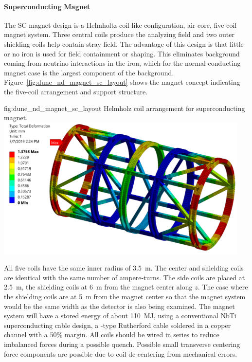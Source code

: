 \paragraph{Superconducting Magnet}
%
The SC magnet design is a Helmholtz-coil-like configuration, air core,  five coil magnet system. Three central coils produce the analyzing field and two outer shielding coils help contain stray field. The advantage of this design is that little or no iron is used for field containment or shaping. This eliminates background coming from neutrino interactions in the iron, which for the normal-conducting magnet case is the largest component of the background. Figure~\ref{fig:dune_nd_magnet_sc_layout} shows the magnet concept indicating the five-coil arrangement and support structure. 
%
%
\begin{dunefigure}{fig:dune_nd_magnet_sc_layout}
{Helmholz coil arrangement for  superconducting magnet.}
\includegraphics[width=0.95\textwidth]{graphics/SC_mag_st.png}
\end{dunefigure}
%
All five coils have the same inner radius of \SI{3.5}{m}. The center and shielding coils are identical with the same number of ampere-turns. The side coils are placed at \SI{2.5}{m}, the shielding coils at \SI{6}{m} from the magnet center along $z$.  The case where the shielding coils are at \SI{5}{m} from the magnet center so that the magnet system would be the same width as the   detector is also being examined.  The magnet system will have a stored energy of about \SI{110}{MJ}, using a conventional NbTi superconducting cable design, a -type Rutherford cable soldered in a copper channel with a 50\% margin. All coils should be wired in series to reduce imbalanced forces during a possible quench. Possible small transverse centering force components are possible due to coil de-centering from mechanical errors. 
